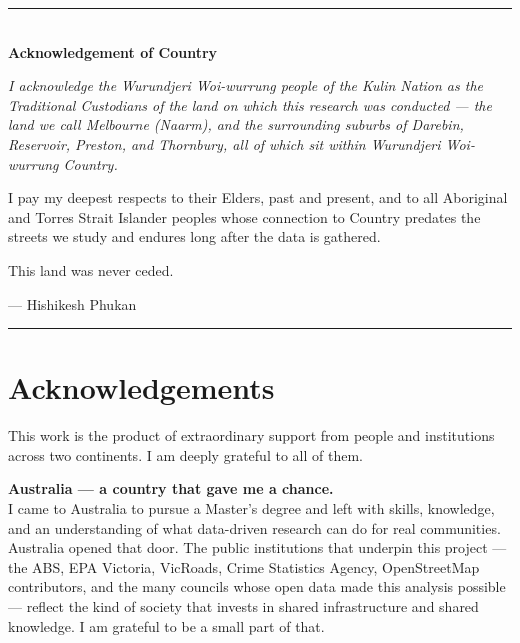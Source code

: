 \documentclass[11pt,a4paper,openany]{book}
\begin{document}
\thispagestyle{empty}
\vspace*{\fill}
\begin{center}
{\color{regengreen}\rule{0.6\linewidth}{1.5pt}}\\[1.2cm]
{\large\bfseries\color{navyblue} Acknowledgement of Country}\\[1cm]
\end{center}
\begin{center}
\parbox{0.82\linewidth}{%
\setlength{\parskip}{0.8em}
\large\itshape
I acknowledge the Wurundjeri Woi-wurrung people of the Kulin Nation as the
Traditional Custodians of the land on which this research was conducted ---
the land we call Melbourne (\textup{Naarm}), and the surrounding suburbs of
Darebin, Reservoir, Preston, and Thornbury, all of which sit within
Wurundjeri Woi-wurrung Country.

\medskip
I pay my deepest respects to their Elders, past and present, and to all
Aboriginal and Torres Strait Islander peoples whose connection to Country
predates the streets we study and endures long after the data is gathered.

\medskip
This land was never ceded.

\smallskip
\begin{flushright}
\normalfont\normalsize\color{navyblue}
--- Hishikesh Phukan
\end{flushright}
}
\end{center}
\vspace*{\fill}
{\color{regengreen}\rule{\linewidth}{0.4pt}}
\clearpage

\chapter*{Acknowledgements}

\noindent
This work is the product of extraordinary support from people and institutions across
two continents.  I am deeply grateful to all of them.

\bigskip
\noindent\textbf{Australia --- a country that gave me a chance.}\\[0.3em]
I came to Australia to pursue a Master's degree and left with skills, knowledge,
and an understanding of what data-driven research can do for real communities.
Australia opened that door.  The public institutions that underpin this project ---
the ABS, EPA Victoria, VicRoads, Crime Statistics Agency, OpenStreetMap contributors,
and the many councils whose open data made this analysis possible --- reflect the kind
of society that invests in shared infrastructure and shared knowledge.  I am grateful
to be a small part of that.
\end{document}
